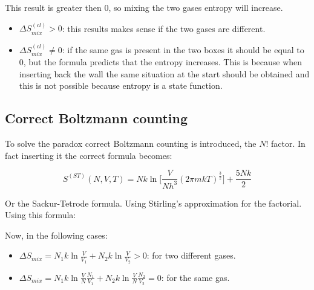 This result is greater then $0$, so mixing the two gases entropy will increase.

\begin{multicols}{2}
	\begin{itemize}
		\item $\Delta S_{mix}^{(cl)} > 0$: this results makes sense if the two gases are different.
		\item $\Delta S_{mix}^{(cl)} \neq 0$: if the same gas is present in the two boxes it should be equal to $0$, but the formula predicts that the entropy increases.
			This is because when inserting back the wall the same situation at the start should be obtained and this is not possible because entropy is a state function.
	\end{itemize}
\end{multicols}

	\subsection{Correct Boltzmann counting}
	To solve the paradox correct Boltzmann counting is introduced, the $N!$ factor.
	In fact inserting it the correct formula becomes:

	$$S^{(ST)}(N, V, T) = Nk\ln\biggl[\frac{V}{Nh^3}(2\pi mkT)^{\frac{3}{2}}\biggr] + \frac{5Nk}{2}$$

	Or the Sackur-Tetrode formula.
	Using Stirling's approximation for the factorial.
	Using this formula:


	Now, in the following cases:

	\begin{multicols}{2}
		\begin{itemize}
			\item $\Delta S_{mix}= N_1k\ln\frac{V}{V_1}+N_2k\ln\frac{V}{V_2} > 0$: for two different gases.
			\item $\Delta S_{mix} = N_1k\ln\frac{V}{N}\frac{N_1}{V_1} + N_2 k\ln\frac{V}{N}\frac{N_2}{V_2}= 0$: for the same gas.
		\end{itemize}
	\end{multicols}
